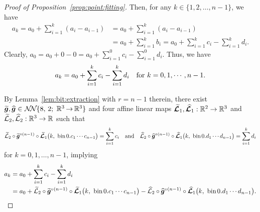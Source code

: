 \documentclass[nohyperref]{article}
\theoremstyle{plain}
\theoremstyle{definition}
\theoremstyle{remark}
\begin{document}
\begin{proof}[Proof of Proposition~\ref{prop:point:fitting}]
	Then, for any $k\in \{1,2,\dotsc,n-1\}$, we have
	\begin{equation*}
		\begin{split}
			a_{k}=a_{0}+\sum_{i=1}^{k }(a_{i}-a_{i-1})
			&=a_0+\sum_{i=1}^{k }(a_{i}-a_{i-1})\\
			&=a_0+\sum_{i=1}^{k }b_i
			=a_0+\sum_{i=1}^{ k }c_{i}
			-\sum_{i=1}^{ k }d_{i}.
		\end{split}
	\end{equation*}
	Clearly, $a_0=a_0+0-0=a_0+\sum_{i=1}^{0}c_i-\sum_{i=1}^{0}d_i$. Thus, we have
	\begin{equation*}
		\begin{split}
			a_{k}=a_0+\sum_{i=1}^{ k }c_{i}
			-\sum_{i=1}^{ k }d_{i}\quad \tn{for $k=0,1,\dotsc,n-1$.}
		\end{split}
	\end{equation*}
	
	
	By Lemma~\ref{lem:bit:extraction} with $r=n-1$ therein, there exist
	$\bmtildeg,\bmhatg\in \nn{8}{2}{3}{3}$ and four affine linear maps 
	$\bmtildecalL_1,\bmhatcalL_1:\R^2\to\R^3$ and $\tildecalL_2,\hatcalL_2:\R^3\to\R$ 
	such that
	\begin{equation*}
		{\mathcal{\widetilde{L}}}_2\circ {\bm{\widetilde{g}}}^{\circ (n-1)}\circ {\bm{\mathcal{\widetilde{L}}}}_1\big(k,\  \textnormal{bin}\hspace{1.5pt} 0.c_1\mathinner{\mkern-0.1mu\cdotp\mkern-0.3mu\cdotp\mkern-0.3mu\cdotp\mkern-0.1mu}  c_{n-1}\big)
		=\sum_{i=1}^{ k }c_{i}
		\quad \textnormal{and}\quad 
		{\mathcal{\widehat{L}}}_2\circ {\bm{\widehat{g}}}^{\circ (n-1)}\circ {\bm{\mathcal{\widehat{L}}}}_1\big(k,\  \textnormal{bin}\hspace{1.5pt} 0.d_1\mathinner{\mkern-0.1mu\cdotp\mkern-0.3mu\cdotp\mkern-0.3mu\cdotp\mkern-0.1mu}  d_{n-1}\big)
		=\sum_{i=1}^{ k }d_{i} 
	\end{equation*}
	for $k=0,1,\dotsc,n-1$, implying
	\begin{equation}
		\label{eq:ak:decom}
		\begin{split}
			a_{k}
			&=a_{0}
			+\sum_{i=1}^{ k }c_{i}
			-\sum_{i=1}^{ k }d_{i}\\
			&=a_0+ 	{\mathcal{\widetilde{L}}}_2\circ {\bm{\widetilde{g}}}^{\circ (n-1)}\circ {\bm{\mathcal{\widetilde{L}}}}_1\big(k,\  \textnormal{bin}\hspace{1.5pt} 0.c_1\mathinner{\mkern-0.1mu\cdotp\mkern-0.3mu\cdotp\mkern-0.3mu\cdotp\mkern-0.1mu}  c_{n-1}\big)
			-
			{\mathcal{\widehat{L}}}_2\circ {\bm{\widehat{g}}}^{\circ (n-1)}\circ {\bm{\mathcal{\widehat{L}}}}_1\big(k,\  \textnormal{bin}\hspace{1.5pt} 0.d_1\mathinner{\mkern-0.1mu\cdotp\mkern-0.3mu\cdotp\mkern-0.3mu\cdotp\mkern-0.1mu}  d_{n-1}\big).
		\end{split}
	\end{equation}
	

\end{proof}
\end{document}
